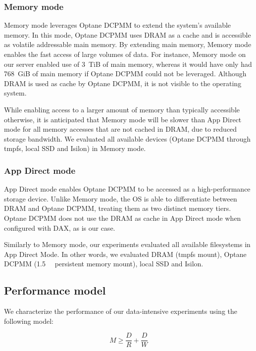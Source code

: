 \documentclass[conference]{IEEEtran}
\begin{document}
\subsubsection{Memory mode}

Memory mode leverages Optane DCPMM to extend the system's available
memory. In this mode, Optane DCPMM uses DRAM as a cache and is accessible as
volatile addressable main memory. By extending main memory, Memory mode enables the
fast access of large volumes of data. For instance, Memory mode on our server enabled use of
3~TiB of main memory, whereas it would have only had 768~GiB of main memory if Optane DCPMM could not be
leveraged. Although DRAM is used as cache by Optane DCPMM, it is not visible to the operating system. 

While enabling access to a larger amount of memory than typically accessible otherwise,
it is anticipated that Memory mode will be slower than App Direct mode for all memory accesses that
are not cached in DRAM, due to reduced storage bandwidth. We evaluated all available devices (Optane DCPMM through tmpfs, local SSD and Isilon)
in Memory mode.

\subsubsection{App Direct mode}

App Direct mode enables Optane DCPMM to be accessed as a high-performance storage device.
Unlike Memory mode, the OS is able to differentiate between DRAM and Optane DCPMM,
treating them as two distinct memory tiers. Optane DCPMM
does not use the DRAM as cache in App Direct mode when configured with DAX, as is our case.

Similarly to Memory mode, our experiments evaluated all available filesystems in App Direct
Mode. In other words, we evaluated DRAM (tmpfs mount), Optane DCPMM (\SI{1.5}{\tebi\byte} persistent
memory mount), local SSD and Isilon.


\subsection{Performance model}

We characterize the performance of our data-intensive experiments using the following model:

\begin{equation}
    M \geq \frac{D}{R} + \frac{D}{W} \label{eq:makespan}
\end{equation}
\end{document}

